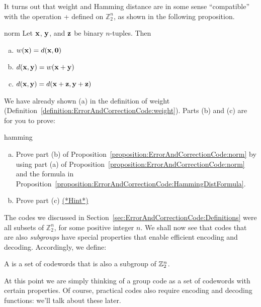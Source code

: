 It turns out that  weight and Hamming distance are in some sense ``compatible'' with the operation + defined on $\mathbb{Z}_2^n$, as shown in the following proposition.

\begin{prop}{norm}
Let ${\bold x}$, ${\bold y}$, and ${\bold z}$ be binary $n$-tuples. Then
\begin{enumerate}[(a)]
\item
$w({\bold x}) = d({\bold x},{\bold 0})$
\item
$d({\bold x},{\bold y}) = w({\bold x}+{\bold y})$
\item
$d({\bold x},{\bold y}) = d({\bold x}+{\bold z},{\bold y}+{\bold z})$
\end{enumerate}
\end{prop}
We have already shown (a) in the definition of weight (Definition~\ref{definition:ErrorAndCorrectionCode:weight}).
Parts (b) and (c) are for you to prove:

\begin{exercise}{hamming}
\begin{enumerate}[(a)]
\item
Prove part (b) of Proposition~\ref{proposition:ErrorAndCorrectionCode:norm} by using part (a) of Proposition~\ref{proposition:ErrorAndCorrectionCode:norm} and the formula in Proposition~\ref{proposition:ErrorAndCorrectionCode:HammingDistFormula}.
\item Prove part (c) \hyperref[sec:ErrorAndCorrectionCode:Hints]{(*Hint*)} 
\end{enumerate}
\end{exercise}
The codes we discussed in Section~\ref{sec:ErrorAndCorrectionCode:Definitions} were all subsets of $\mathbb{Z}_2^n$, for some positive integer $n$. We shall now see that codes that are also \emph{subgroups} have special properties that enable efficient encoding and decoding. Accordingly, we define:

\begin{defn}
 A  is a set of codewords that is also a subgroup of ${\Bbb
Z}_2^n$.  
 \end{defn}

\begin{rem} At this point we are simply thinking of a group code as a set of codewords with certain properties. Of course, practical codes also require  encoding and decoding functions: we'll talk about these later.
\end{rem} 

